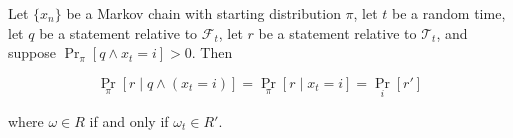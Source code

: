 Let $\{x_n\}$ be a Markov chain with starting distribution $\pi$, let $t$ be a random time, let $q$ be a statement relative to $\mathcal{F}_t$, let $r$ be a statement relative to $\mathcal{T}_t$, and suppose $\Pr_\pi[q \wedge x_t = i] > 0$. Then

$$\Pr_\pi[r \mid q \wedge (x_t = i)] = \Pr_\pi[r \mid x_t = i] = \Pr_i[r']$$

where $\omega \in R$ if and only if $\omega_t \in R'$.
